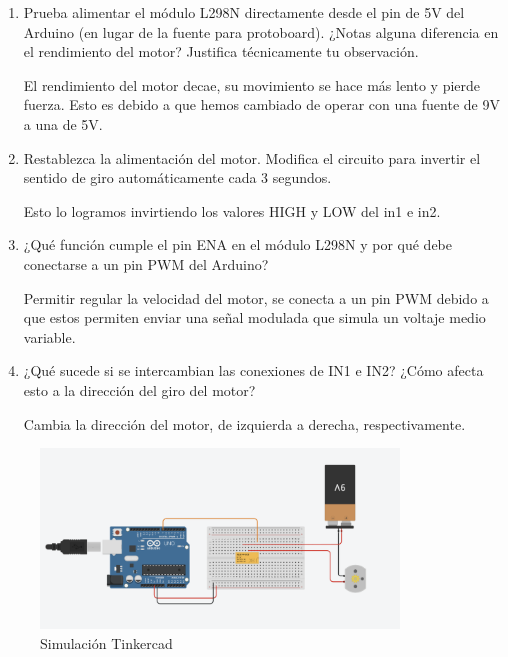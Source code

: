 \begin{enumerate}
    \item Prueba alimentar el módulo L298N directamente desde el pin de 5V del Arduino (en lugar de la fuente para protoboard). ¿Notas alguna diferencia en el rendimiento del motor? Justifica técnicamente tu observación.

    El rendimiento del motor decae, su movimiento se hace más lento y pierde fuerza. Esto es debido a que hemos cambiado de operar con una fuente de 9V a una de 5V.
        
    \item Restablezca la alimentación del motor. Modiﬁca el circuito para invertir el sentido de giro automáticamente cada 3 segundos.

    Esto lo logramos invirtiendo los valores HIGH y LOW del in1 e in2.
    
    \item ¿Qué función cumple el pin ENA en el módulo L298N y por qué debe conectarse a un pin PWM del Arduino?

    Permitir regular la velocidad del motor, se conecta a un pin PWM debido a que estos permiten enviar una señal modulada que simula un voltaje medio variable. 
    
    \item ¿Qué sucede si se intercambian las conexiones de IN1 e IN2? ¿Cómo afecta esto a la dirección del giro del motor?

    Cambia la dirección del motor, de izquierda a derecha, respectivamente.
\end{enumerate}

\begin{figure}[H]
    \centering
    \includegraphics[width=0.85\textwidth]{./img/simulacion_puenteh.png}
    \caption{Simulación Tinkercad}
    \label{fig:motor_driver}
\end{figure}

